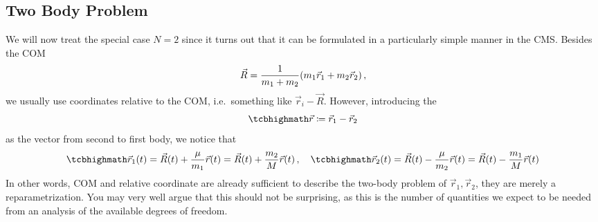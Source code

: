 \documentclass[../class_mech_main.tex]{subfiles}
\begin{document}
	    \subsection{Two Body Problem}
We will now treat the special case $N = 2$ since it turns out that it can be formulated in a particularly simple manner in the CMS. Besides the COM
\begin{equation}
	\vec{R} = \frac{1}{m_1 + m_2} \qty(m_1 \vec{r}_1 + m_2 \vec{r}_2)
	\, ,
\end{equation}
we usually use coordinates relative to the COM, i.e.~something like $\vec{r}_i - \vec{R}$. However, introducing the 
\begin{equation}\label{eq:com_relative_coord}
	\eqbox{
		\vec{r} \coloneqq \vec{r}_1 - \vec{r}_2
	}
\end{equation}
as the vector from second to first body, we notice that
\begin{equation}\label{eq:trafo_com_components}
	\eqbox{
		\vec{r}_1(t) = \vec{R}(t) + \frac{\mu}{m_1} \vec{r}(t) = \vec{R}(t) + \frac{m_2}{M} \vec{r}(t)
	}
	\, , \quad
	\eqbox{
		\vec{r}_2(t) = \vec{R}(t) - \frac{\mu}{m_2} \vec{r}(t) = \vec{R}(t) - \frac{m_1}{M} \vec{r}(t)
	}
\end{equation}
In other words, COM and relative coordinate are already sufficient to describe the two-body problem of $\vec{r}_1, \vec{r}_2$, they are merely a reparametrization. You may very well argue that this should not be surprising, as this is the number of quantities we expect to be needed from an analysis of the available degrees of freedom.
\end{document}
